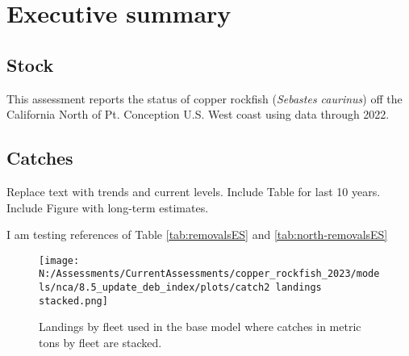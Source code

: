 \documentclass[11pt,
  english,
  letterpaper,
]{article}
\begin{document}
\pagestyle{plain}  %
\renewcommand*{\thefootnote}{\arabic{footnote}}  %
\setcounter{footnote}{0}  %
\renewcommand{\headrulewidth}{0.5pt}
\renewcommand{\footrulewidth}{0.5pt}

\newcommand{\lt}{\ensuremath <}
\newcommand{\gt}{\ensuremath >}

\pagebreak
{}
\setcounter{page}{1}

\renewcommand{\thetable}{\roman{table}}
\renewcommand{\thefigure}{\roman{figure}}

\setlength\parskip{0.5em plus 0.1em minus 0.2em}

\hypertarget{executive-summary}{%
\section*{Executive summary}\label{executive-summary}}

\hypertarget{stock}{%
\subsection*{Stock}\label{stock}}

This assessment reports the status of copper rockfish (\emph{Sebastes caurinus}) off the California North of Pt. Conception U.S. West coast using data through 2022.

\hypertarget{catches}{%
\subsection*{Catches}\label{catches}}

Replace text with trends and current levels. Include Table for last 10 years. Include Figure with long-term estimates.

I am testing references of Table \ref{tab:removalsES} and \ref{tab:north-removalsES}





\begin{figure}
\centering
\texttt{[image: N:/Assessments/CurrentAssessments/copper\_rockfish\_2023/models/nca/8.5\_update\_deb\_index/plots/catch2 landings stacked.png]}
\caption{Landings by fleet used in the base model where catches in metric tons by fleet are stacked.\label{fig:es-catch}}
\end{figure}
\end{document}
